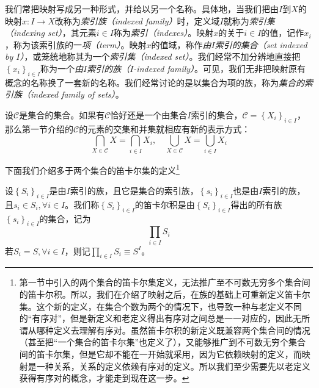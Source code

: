 \documentclass[../main.tex]{subfiles}
\begin{document}
我们常把映射写成另一种形式，并给以另一个名称。具体地，当我们把由$I$到$X$的映射$x:I\rightarrow X$改称为\emph{索引族（indexed family）}时，定义域$I$就称为\emph{索引集（indexing set）}，其元素$i\in I$称为\emph{索引（indexes）}。映射$x$的关于$i\in I$的值，记作$x_i$，称为该索引族的一\emph{项（term）}。映射$x$的值域，称作\emph{由$I$索引的集合（set indexed by $I$）}，或笼统地称其为一个\emph{索引集（indexed set）}。我们经常不加分辨地直接把$\left\{x_i\right\}_{i\in I}$称为一个\emph{由$I$索引的族（$I$-indexed family）}。可见，我们无非把映射原有概念的名称换了一套新的名称。我们经常讨论的是以集合为项的族，称为\emph{集合的索引族（indexed family of sets）}。

设$\mathcal{C}$是集合的集合。如果有$\mathcal{C}$恰好还是一个由集合$I$索引的集合，$\mathcal{C}=\left\{X_i\right\}_{i\in I}$，那么第一节介绍的$\mathcal{C}$的元素的交集和并集就相应有新的表示方式：
\[
    \bigcap_{X\in\mathcal{C}}X=\bigcap_{i\in I}X_i,\quad\bigcup_{X\in\mathcal{C}}X=\bigcup_{i\in I}X_i
\]

下面我们介绍多于两个集合的笛卡尔集的定义\footnote{第一节中引入的两个集合的笛卡尔集定义，无法推广至不可数无穷多个集合间的笛卡尔积。所以，我们在介绍了映射之后，在族的基础上可重新定义笛卡尔集。这个新的定义，在集合个数为两个的情况下，也导致一种与老定义不同的“有序对”，但是新定义和老定义得出有序对之间总是一一对应的，因此无所谓从哪种定义去理解有序对。虽然笛卡尔积的新定义既兼容两个集合间的情况（甚至把“一个集合的笛卡尔集”也定义了），又能够推广到不可数无穷个集合间的笛卡尔集，但是它却不能在一开始就采用，因为它依赖映射的定义，而映射是一种关系，关系的定义依赖有序对的定义。所以我们至少需要先以老定义获得有序对的概念，才能走到现在这一步。}

\begin{definition}[笛卡尔积]\label{def:Cartesian_product_family}
    设$\left\{S_i\right\}_{i\in I}$是由$I$索引的族，且它是集合的索引族，$\left\{s_i\right\}_{i\in I}$也是由$I$索引的族，且$s_i\in S_i,\forall i\in I$。我们称$\left\{S_i\right\}_{i\in I}$的笛卡尔积是由$\left\{S_i\right\}_{i\in I}$得出的所有族$\left\{s_i\right\}_{i\in I}$的集合，记为
    \[
        \prod_{i\in I}S_i
    \]
    若$S_i=S,\forall i\in I$，则记$\prod_{i\in I}S_i\equiv S^I$。
\end{definition}
\end{document}
